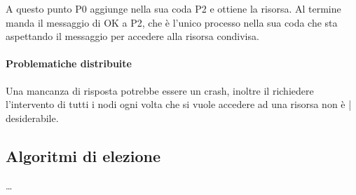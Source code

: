 A questo punto P0 aggiunge nella sua coda P2 e ottiene la 
risorsa. Al termine manda il messaggio di OK a P2, che è l'unico 
processo nella sua coda che sta aspettando il messaggio 
per accedere alla risorsa condivisa.

\paragraph{Problematiche distribuite}
Una mancanza di risposta potrebbe essere un crash, 
inoltre il richiedere l'intervento di tutti 
i nodi ogni volta che si vuole accedere ad una risorsa non è |
desiderabile.

\subsection{Algoritmi di elezione}
\dots